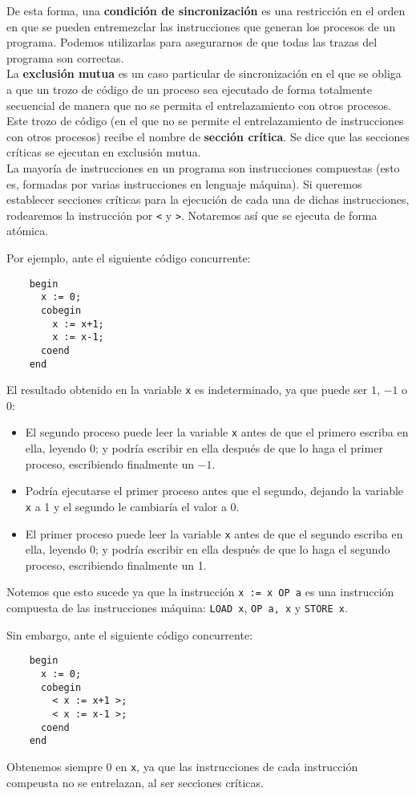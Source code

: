 De esta forma, una \textbf{condición de sincronización} es una restricción en el orden en que se pueden entremezclar las instrucciones que generan los procesos de un programa. Podemos utilizarlas para asegurarnos de que todas las trazas del programa son correctas.\\

La \textbf{exclusión mutua} es un caso particular de sincronización en el que se obliga a que un trozo de código de un proceso sea ejecutado de forma totalmente secuencial de manera que no se permita el entrelazamiento con otros procesos. Este trozo de código (en el que no se permite el entrelazamiento de instrucciones con otros procesos) recibe el nombre de \textbf{sección crítica}. Se dice que las secciones críticas se ejecutan en exclusión mutua.\\

La mayoría de instrucciones en un programa son instrucciones compuestas (esto es, formadas por varias instrucciones en lenguaje máquina). Si queremos establecer secciones críticas para la ejecución de cada una de dichas instrucciones, rodearemos la instrucción por \verb|<| y \verb|>|.
Notaremos así que se ejecuta de forma atómica.

\begin{ejemplo}
    Por ejemplo, ante el siguiente código concurrente:
    \begin{verbatim}
    begin
      x := 0;
      cobegin
        x := x+1;
        x := x-1;
      coend
    end
    \end{verbatim}
    El resultado obtenido en la variable \verb|x| es indeterminado, ya que puede ser $1$, $-1$ o $0$:
    \begin{itemize}
        \item El segundo proceso puede leer la variable \verb|x| antes de que el primero escriba en ella, leyendo 0; y podría escribir en ella después de que lo haga el primer proceso, escribiendo finalmente un $-1$.
        \item Podría ejecutarse el primer proceso antes que el segundo, dejando la variable \verb|x| a 1 y el segundo le cambiaría el valor a 0.
        \item El primer proceso puede leer la variable \verb|x| antes de que el segundo escriba en ella, leyendo 0; y podría escribir en ella después de que lo haga el segundo proceso, escribiendo finalmente un 1.
    \end{itemize}
    Notemos que esto sucede ya que la instrucción \verb|x := x OP a| es una instrucción compuesta de las instrucciones máquina: \verb|LOAD x|, \verb|OP a, x| y \verb|STORE x|.

    Sin embargo, ante el siguiente código concurrente:
    \begin{verbatim}
    begin
      x := 0;
      cobegin
        < x := x+1 >;
        < x := x-1 >;
      coend
    end
    \end{verbatim}
    Obtenemos siempre 0 en \verb|x|, ya que las instrucciones de cada instrucción compeusta no se entrelazan, al ser secciones críticas. 
\end{ejemplo}

